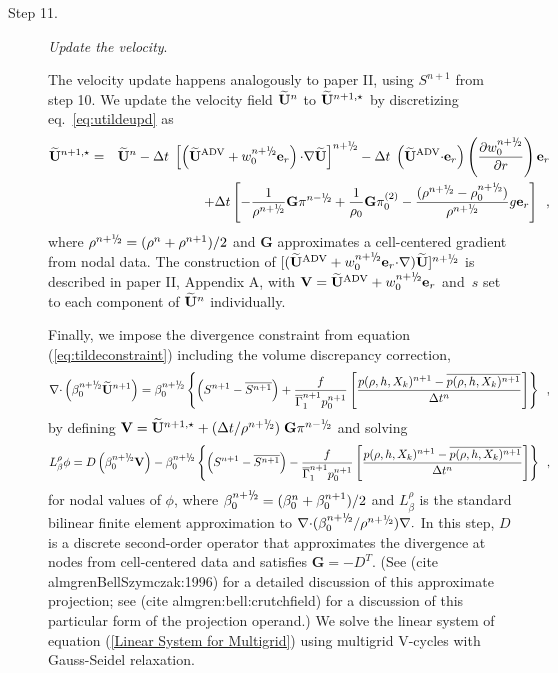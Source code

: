 \begin{description}
\begin{enumerate}
\end{enumerate}


\item[Step 11.] {\em Update the velocity}.  

The velocity update happens analogously to paper II, using $S^{n+1}$ from step 10.
We update the velocity field $\widetilde{{\bf U}}^n$ to $\widetilde{{\bf U}}^{n+1,\star}$ by discretizing eq.~\ref{eq:utildeupd}
as
\begin{eqnarray}
\Ubt^{n+1,\star} &=& \Ubt^n - \dt \;
 \left[\left(\uadvtwo+ w_0^{\nph} \er\right) \cdotb \nablab \Ubt \right]^\nph
      - \dt \; \left(\uadvtwo \cdotb \er\right)  \left(\frac{\partial w_0^{\nph}}{\partial r} \right) \er \nonumber \\
   &&   + \dt \left[ - \frac{1}{\rho^\nph} {\mathbf{G}} \pi^\nmh
        + \frac{1}{\rho_0} {\mathbf{G}} \pizerotwo
        - \frac{(\rho^\nph-\rhozero^\nph)}{\rho^\nph} g \er \right] \enskip ,
\end{eqnarray}
where $\rho^\nph = ( \rho^n + \rho^{n+1} )/2$
and $\mathbf{G}$ approximates a cell-centered gradient from nodal data. 
The construction of $[(\uadvtwo+ w_0^{\nph} \er \cdotb \nablab) \Ubt ]^\nph$
is described in paper II, Appendix A, with $\Vb = \uadvtwo+w_0^{\nph} \er$ and~$s$ set to each
component of $\widetilde{{\bf U}}^n$ individually.

Finally, we impose the divergence constraint from equation (\ref{eq:tildeconstraint}) 
including the volume discrepancy correction,
\begin{equation}
\nablab \cdotb \left(\beta_0^{\nph} \Ubt^{n+1} \right)  = \beta_0^{\nph}\left\{  \left(S^{n+1} - \overline{S^{n+1}} \right)
+ \frac{f}{\gammabar^{n+1} p_0^{n+1}}
\left[\frac{p(\rho,h,X_k)^{n+1} - \overline{p(\rho,h,X_k)^{n+1}}}{\Delta t^n}\right]\right\}
\enskip,
\end{equation}
by defining ${\bf V} = \Ubt^{n+1,\star} + ( \dt / \rho^\nph ) \; \mathbf{G} \pi^\nmh$ 
and solving
\begin{equation}
 L_\beta^\rho \phi =
   D \left ( \beta_0^{\nph} {\bf V} \right) - \beta_0^{\nph}\left\{ \left(S^{n+1}-\overline{S^{n+1}} \right)
- \frac{f}{\gammabar^{n+1} p_0^{n+1}}
\left[\frac{p(\rho,h,X_k)^{n+1} - \overline{p(\rho,h,X_k)^{n+1}}}{\Delta t^n}\right]\right\} \enskip, \label{Linear System for Multigrid}
\end{equation}
for nodal values of $\phi$, where
$\beta_0^\nph = ( \beta_0^n + \beta_0^{n+1} )/2$ and
$L_\beta^\rho$ is the standard bilinear
finite element approximation to $\nablab \cdotb ({\beta_0^\nph}/{\rho^\nph}) \nablab.$
In this step, $D$ is a discrete second-order operator that approximates the 
divergence at nodes from cell-centered data and satisfies
$\mathbf{G} = -D^T.$ 
(See (cite almgrenBellSzymczak:1996) for a detailed discussion of this
approximate projection; see (cite almgren:bell:crutchfield) for a discussion
of this particular form of the projection operand.)  
We solve the linear system of equation (\ref{Linear System for Multigrid})
using multigrid V-cycles with Gauss-Seidel relaxation.


\end{description}
